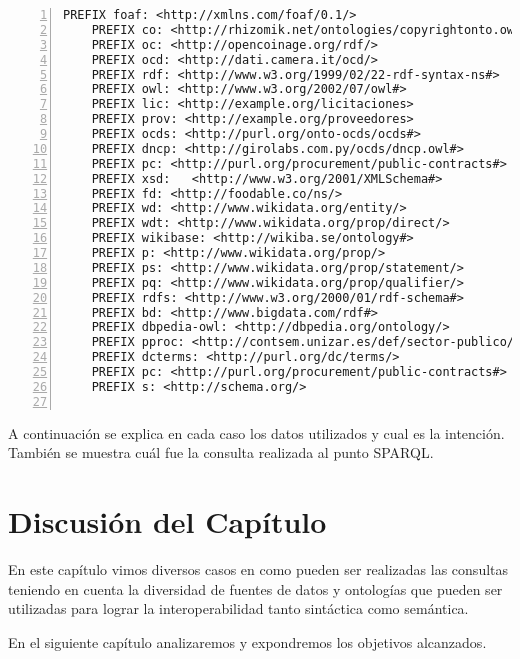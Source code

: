 \begin{lstlisting}[captionpos=b, caption={Prefijos de las consultas SPARQL}, label={lst:prefijos},  numbers=left,  numberstyle=\tiny\color{mygray},
    basicstyle=\ttfamily,frame=single]
    PREFIX foaf: <http://xmlns.com/foaf/0.1/>
    PREFIX co: <http://rhizomik.net/ontologies/copyrightonto.owl#>
    PREFIX oc: <http://opencoinage.org/rdf/>
    PREFIX ocd: <http://dati.camera.it/ocd/>
    PREFIX rdf: <http://www.w3.org/1999/02/22-rdf-syntax-ns#>
    PREFIX owl: <http://www.w3.org/2002/07/owl#>
    PREFIX lic: <http://example.org/licitaciones>
    PREFIX prov: <http://example.org/proveedores>
    PREFIX ocds: <http://purl.org/onto-ocds/ocds#>
    PREFIX dncp: <http://girolabs.com.py/ocds/dncp.owl#>
    PREFIX pc: <http://purl.org/procurement/public-contracts#>
    PREFIX xsd:   <http://www.w3.org/2001/XMLSchema#>
    PREFIX fd: <http://foodable.co/ns/>
    PREFIX wd: <http://www.wikidata.org/entity/>
    PREFIX wdt: <http://www.wikidata.org/prop/direct/>
    PREFIX wikibase: <http://wikiba.se/ontology#>
    PREFIX p: <http://www.wikidata.org/prop/>
    PREFIX ps: <http://www.wikidata.org/prop/statement/>
    PREFIX pq: <http://www.wikidata.org/prop/qualifier/>
    PREFIX rdfs: <http://www.w3.org/2000/01/rdf-schema#>
    PREFIX bd: <http://www.bigdata.com/rdf#>
    PREFIX dbpedia-owl: <http://dbpedia.org/ontology/>
    PREFIX pproc: <http://contsem.unizar.es/def/sector-publico/pproc#> 
    PREFIX dcterms: <http://purl.org/dc/terms/> 
    PREFIX pc: <http://purl.org/procurement/public-contracts#> 
    PREFIX s: <http://schema.org/> 
    
 \end{lstlisting}


 A continuación se explica en cada caso los datos utilizados y cual es la intención. También se muestra cuál fue la consulta realizada al punto SPARQL.

















 \section{Discusión del Capítulo }

 En este capítulo vimos diversos casos en como pueden ser realizadas las consultas teniendo en cuenta la diversidad de fuentes de datos y ontologías que pueden ser utilizadas para lograr la interoperabilidad tanto sintáctica como semántica. 

 En el siguiente capítulo analizaremos y expondremos los objetivos alcanzados.
 


